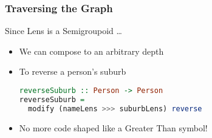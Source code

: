\begin{frame}[fragile]
\frametitle{Traversing the Graph}

\begin{block}{Since Lens is a Semigroupoid \ldots}
\begin{itemize}
\item We can compose to an arbitrary depth
\item To reverse a person's suburb
\begin{lstlisting}[language=haskell]
reverseSuburb :: Person -> Person
reverseSuburb =
  modify (nameLens >>> suburbLens) reverse
\end{lstlisting}
\item No more code shaped like a Greater Than symbol!

\end{itemize}
\end{block}

\end{frame}

